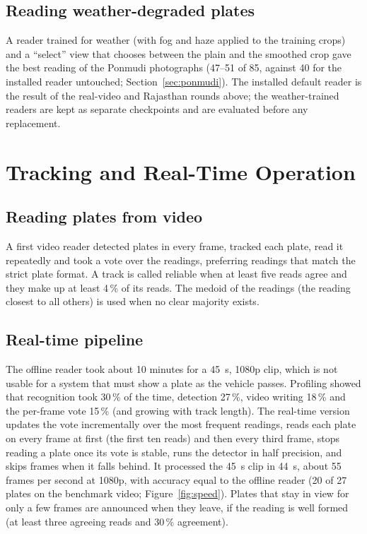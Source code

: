 \subsection{Reading weather-degraded plates}

A reader trained for weather (with fog and haze applied to the training crops)
and a ``select'' view that chooses between the plain and the smoothed crop gave
the best reading of the Ponmudi photographs (47--51 of 85, against 40 for the
installed reader untouched; Section~\ref{sec:ponmudi}). The installed default
reader is the result of the real-video and Rajasthan rounds above; the
weather-trained readers are kept as separate checkpoints and are evaluated
before any replacement.

\section{Tracking and Real-Time Operation}
\label{sec:realtime}

\subsection{Reading plates from video}

A first video reader detected plates in every frame, tracked each plate, read
it repeatedly and took a vote over the readings, preferring readings that match
the strict plate format. A track is called reliable when at least five reads
agree and they make up at least 4\,\% of its reads. The medoid of the readings
(the reading closest to all others) is used when no clear majority exists.

\subsection{Real-time pipeline}

The offline reader took about 10 minutes for a 45~s, 1080p clip, which is not
usable for a system that must show a plate as the vehicle passes. Profiling
showed that recognition took 30\,\% of the time, detection 27\,\%, video writing
18\,\% and the per-frame vote 15\,\% (and growing with track length). The
real-time version updates the vote incrementally over the most frequent
readings, reads each plate on every frame at first (the first ten reads) and
then every third frame, stops reading a plate once its vote is stable, runs the
detector in half precision, and skips frames when it falls behind. It processed
the 45~s clip in 44~s, about 55 frames per second at 1080p, with accuracy equal
to the offline reader (20 of 27 plates on the benchmark video;
Figure~\ref{fig:speed}). Plates that stay in view for only a few frames are
announced when they leave, if the reading is well formed (at least three agreeing
reads and 30\,\% agreement).

